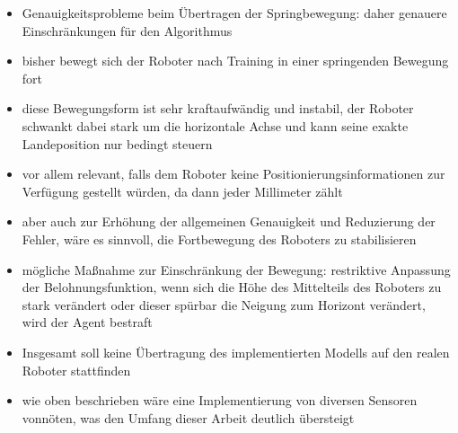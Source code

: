\begin{itemize}
    \item Genauigkeitsprobleme beim Übertragen der Springbewegung: daher genauere Einschränkungen für den Algorithmus
    \item bisher bewegt sich der Roboter nach Training in einer springenden Bewegung fort
    \item diese Bewegungsform ist sehr kraftaufwändig und instabil, der Roboter schwankt dabei stark um die horizontale Achse und kann seine exakte Landeposition nur bedingt steuern
    \item vor allem relevant, falls dem Roboter keine Positionierungsinformationen zur Verfügung gestellt würden, da dann jeder Millimeter zählt
    \item aber auch zur Erhöhung der allgemeinen Genauigkeit und Reduzierung der Fehler, wäre es sinnvoll, die Fortbewegung des Roboters zu stabilisieren
    \item mögliche Maßnahme zur Einschränkung der Bewegung: restriktive Anpassung der Belohnungsfunktion, wenn sich die Höhe des Mittelteils des Roboters zu stark verändert oder dieser spürbar die Neigung zum Horizont verändert, wird der Agent bestraft
    
    \item Insgesamt soll keine Übertragung des implementierten Modells auf den realen Roboter stattfinden
    \item wie oben beschrieben wäre eine Implementierung von diversen Sensoren vonnöten, was den Umfang dieser Arbeit deutlich übersteigt
\end{itemize}

